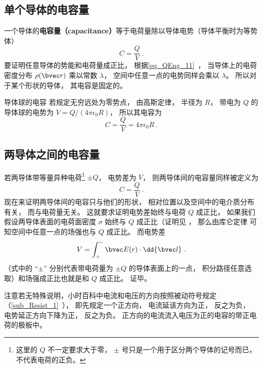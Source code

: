 

\subsection{单个导体的电容量}

一个导体的\textbf{电容量（capacitance）}等于电荷量除以导体电势（导体平衡时为等势体）
\begin{equation}\label{eq_Cpctor_2}
C = \frac{Q}{V}~.
\end{equation}
要证明任意导体的势能和电荷量成正比， 根据\autoref{eq_QEng_11}~， 当导体上的电荷密度分布 $\rho(\bvec r)$ 乘以常数 $\lambda$， 空间中任意一点的电势同样会乘以 $\lambda$。 所以对于某个形状的导体， 其电容是固定的。

\begin{example}{导体球的电容}\label{ex_Cpctor_1}
若规定无穷远处为零势点， 由高斯定律， 半径为 $R$， 带电为 $Q$ 的导体球的电势为 $V = Q/(4\pi\epsilon_0 R)$， 所以其电容为
\begin{equation}\label{eq_Cpctor_1}
C = \frac{Q}{V} = 4\pi\epsilon_0 R~.
\end{equation}
\end{example}

\subsection{两导体之间的电容量}
若两导体带等量异种电荷\footnote{这里的 $Q$ 不一定要求大于零， $\pm$ 号只是一个用于区分两个导体的记号而已， 不代表电荷的正负。} $\pm Q$， 电势差为 $V$， 则两导体间的电容量同样被定义为
\begin{equation}
C = \frac{Q}{V}~.
\end{equation}
现在来证明两导体间的电容只与他们的形状， 相对位置以及空间中的电介质分布有关， 而与电荷量无关。 这就要求证明电势差始终与电荷 $Q$ 成正比， 如果我们假设两导体表面的电荷面密度 $\sigma$ 始终与 $Q$ 成正比（证明见%
， 那么由库仑定律%
可知空间中任意一点的场强也与 $Q$ 成正比。 而电势差
\begin{equation}
V = \int_+^- \bvec E(r) \cdot \dd{\bvec l}~.
\end{equation}
（式中的 “$\pm$” 分别代表带电荷量为 $\pm Q$ 的导体表面上的一点， 积分路径任意选取）和场强成正比也就是和 $Q$ 成正比。 证毕。

注意若无特殊说明，小时百科中电流和电压的方向按照被动符号规定（\autoref{sub_Resist_1}~）， 即先规定一个正方向， 电流延该方向为正， 反之为负， 电势延正方向下降为正， 反之为负。 正方向的电流流入电压为正的电容的带正电荷的极板中。

